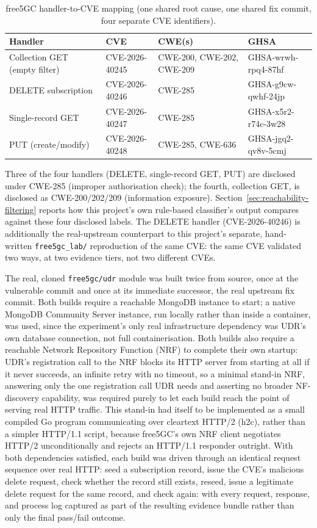 \documentclass[12pt,a4paper]{report}
\begin{document}
\begin{table}[H]
\centering
\caption{free5GC handler-to-CVE mapping (one shared root cause, one shared fix commit, four separate CVE identifiers).}
\label{tab:free5gc-handler-cve-map}
\begin{tabular}{@{}p{4cm}p{3.3cm}p{2cm}p{4cm}@{}}
\toprule
\textbf{Handler} & \textbf{CVE} & \textbf{CWE(s)} & \textbf{GHSA} \\
\midrule
Collection GET (empty filter) & CVE-2026-40245 & CWE-200, CWE-202, CWE-209 & GHSA-wrwh-rpq4-87hf \\
DELETE subscription & CVE-2026-40246 & CWE-285 & GHSA-g9cw-qwhf-24jp \\
Single-record GET & CVE-2026-40247 & CWE-285 & GHSA-x5r2-r74c-3w28 \\
PUT (create/modify) & CVE-2026-40248 & CWE-285, CWE-636 & GHSA-jgq2-qv8v-5cmj \\
\bottomrule
\end{tabular}
\end{table}

Three of the four handlers (DELETE, single-record GET, PUT) are disclosed under CWE-285 (improper authorisation check); the fourth, collection GET, is disclosed as CWE-200/202/209 (information exposure). Section~\ref{sec:reachability-filtering} reports how this project's own rule-based classifier's output compares against these four disclosed labels. The DELETE handler (CVE-2026-40246) is additionally the real-upstream counterpart to this project's separate, hand-written \texttt{free5gc\_lab/} reproduction of the same CVE: the same CVE validated two ways, at two evidence tiers, not two different CVEs.

The real, cloned \texttt{free5gc/udr} module was built twice from source, once at the vulnerable commit and once at its immediate successor, the real upstream fix commit. Both builds require a reachable MongoDB instance to start; a native MongoDB Community Server instance, run locally rather than inside a container, was used, since the experiment's only real infrastructure dependency was UDR's own database connection, not full containerisation. Both builds also require a reachable Network Repository Function (NRF) to complete their own startup: UDR's registration call to the NRF blocks its HTTP server from starting at all if it never succeeds, an infinite retry with no timeout, so a minimal stand-in NRF, answering only the one registration call UDR needs and asserting no broader NF-discovery capability, was required purely to let each build reach the point of serving real HTTP traffic. This stand-in had itself to be implemented as a small compiled Go program communicating over cleartext HTTP/2 (h2c), rather than a simpler HTTP/1.1 script, because free5GC's own NRF client negotiates HTTP/2 unconditionally and rejects an HTTP/1.1 responder outright. With both dependencies satisfied, each build was driven through an identical request sequence over real HTTP: seed a subscription record, issue the CVE's malicious delete request, check whether the record still exists, reseed, issue a legitimate delete request for the same record, and check again: with every request, response, and process log captured as part of the resulting evidence bundle rather than only the final pass/fail outcome.
\end{document}
